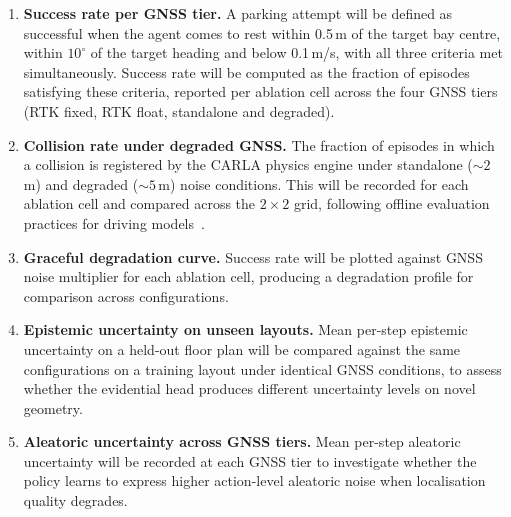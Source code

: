 \documentclass{sig-alternate}
\makeatletter
\renewcommand\section{\@startsection{section}{1}{\z@}%
    {-10\p@ \@plus -4\p@ \@minus -2\p@}%
    {16\p@}%
    {\baselineskip 14pt\secfnt\@ucheadtrue}}
\makeatother
\begin{document}
\begin{enumerate}

    \item \textbf{Success rate per GNSS tier.} A parking attempt will be defined as successful when the agent comes to rest within 0.5\,m of the target bay centre, within $10^\circ$ of the target heading and below 0.1\,m/s, with all three criteria met simultaneously. Success rate will be computed as the fraction of episodes satisfying these criteria, reported per ablation cell across the four GNSS tiers (RTK fixed, RTK float, standalone and degraded).

    \item \textbf{Collision rate under degraded GNSS.} The fraction of episodes in which a collision is registered by the CARLA physics engine under standalone (${\sim}2$\,m) and degraded (${\sim}5$\,m) noise conditions. This will be recorded for each ablation cell and compared across the $2 \times 2$ grid, following offline evaluation practices for driving models~\cite{codevilla2018offline}.

    \item \textbf{Graceful degradation curve.} Success rate will be plotted against GNSS noise multiplier for each ablation cell, producing a degradation profile for comparison across configurations.

    \item \textbf{Epistemic uncertainty on unseen layouts.} Mean per-step epistemic uncertainty on a held-out floor plan will be compared against the same configurations on a training layout under identical GNSS conditions, to assess whether the evidential head produces different uncertainty levels on novel geometry.

    \item \textbf{Aleatoric uncertainty across GNSS tiers.} Mean per-step aleatoric uncertainty will be recorded at each GNSS tier to investigate whether the policy learns to express higher action-level aleatoric noise when localisation quality degrades.

\end{enumerate}


\end{document}
